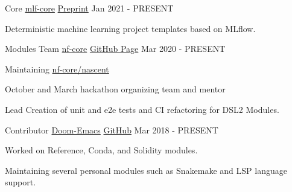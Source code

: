 

\begin{cventries}


	\cventry
	{Core} %
	{\href{https://www.mlf-core.com/index}{mlf-core}} %
	{\href{https://arxiv.org/abs/2104.07651}{Preprint}}
	{Jan 2021 - PRESENT} %
	{
		\begin{cvitems} %
			\item {Deterministic machine learning project templates based on MLflow.}
		\end{cvitems}
	}

	\cventry
	{Modules Team} %
	{\href{https://nf-co.re/}{nf-core}} %
	{\href{https://github.com/nf-core}{GitHub Page}} %
	{Mar 2020 - PRESENT} %
	{
		\begin{cvitems} %
			\item {Maintaining \href{https://nf-co.re/nascent}{nf-core/nascent}}
			\item {October and March hackathon organizing team and mentor}
			\item {Lead Creation of unit and e2e tests and CI refactoring for DSL2 Modules.}
		\end{cvitems}
	}


	\cventry
	{Contributor} %
	{\href{https://github.com/hlissner/doom-emacs}{Doom-Emacs}} %
	{\href{https://github.com/hlissner/doom-emacs}{GitHub}} %
	{Mar 2018 - PRESENT} %
	{
		\begin{cvitems} %
			\item {Worked on Reference, Conda, and Solidity modules.}
			\item {Maintaining several personal modules such as Snakemake and LSP language support.}
		\end{cvitems}
	}


\end{cventries}

